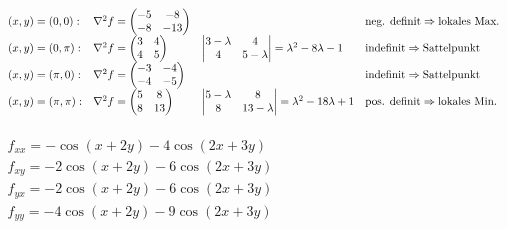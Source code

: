 \documentclass[12pt,a4paper,titlepage]{article}
\begin{document}
$\begin{array}{l l l l}
  (x,y)=(0,0): & \nabla^2f=\begin{pmatrix}-5&-8 \\ -8&-13\end{pmatrix} & & \text{neg. definit} \Rightarrow \text{lokales Max.}\\
  (x,y)=(0,\pi): & \nabla^2f=\begin{pmatrix}3&4 \\ 4&5\end{pmatrix} & \left|\begin{matrix}3-\lambda&4 \\ 4&5-\lambda\end{matrix}\right| = \lambda^2-8\lambda-1 & \text{indefinit} \Rightarrow \text{Sattelpunkt}\\
  (x,y)=(\pi,0): & \nabla^2f=\begin{pmatrix}-3&-4 \\ -4&-5\end{pmatrix} & & \text{indefinit} \Rightarrow \text{Sattelpunkt}\\
  (x,y)=(\pi,\pi): & \nabla^2f=\begin{pmatrix}5&8 \\ 8&13\end{pmatrix} & \left|\begin{matrix}5-\lambda&8 \\ 8&13-\lambda\end{matrix}\right|=\lambda^2-18\lambda+1 & \text{pos. definit} \Rightarrow \text{lokales Min.}  
\end{array}$ \\ 
\\
$\begin{array}{l}
  f_{xx}=-\cos(x+2y)-4\cos(2x+3y) \\
  f_{xy}=-2\cos(x+2y)-6\cos(2x+3y) \\
  f_{yx}=-2\cos(x+2y)-6\cos(2x+3y) \\
  f_{yy}=-4\cos(x+2y)-9\cos(2x+3y)
\end{array}$
\end{document}
